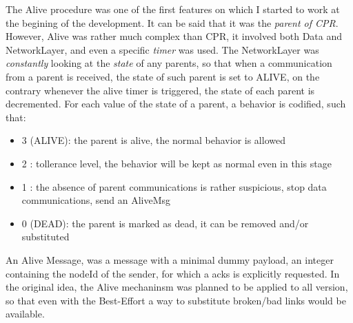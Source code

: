\documentclass{article}
\begin{document}
The Alive procedure was one of the first features on which I started to work at the begining of the development. It can be said that it was the \emph{parent of CPR}. However, Alive was rather much complex than CPR, it involved both Data and NetworkLayer, and even a specific \textit{timer} was used. The NetworkLayer was \textit{constantly} looking at the \emph{state} of any parents, so that when a communication from a parent is received, the state of such parent is set to ALIVE, on the contrary whenever the alive timer is triggered, the state of each parent is decremented. For each value of the state of a parent, a behavior is codified, such that:
		\begin{itemize}
			\item 3 (ALIVE): the parent is alive, the normal behavior is allowed
			\item 2 : tollerance level, the behavior will be  kept as normal even in this stage
			\item 1 : the absence of parent communications is rather suspicious, stop data communications, send an AliveMsg
			\item 0 (DEAD): the parent is marked as dead, it can be removed and/or substituted
		\end{itemize}
An Alive Message, was a message with a minimal dummy payload, an integer containing the nodeId of the sender, for which a acks is explicitly requested. In the original idea, the Alive mechaninsm was planned to be applied to all version, so that even with the Best-Effort a way to substitute broken/bad links would be available.
\end{document}

